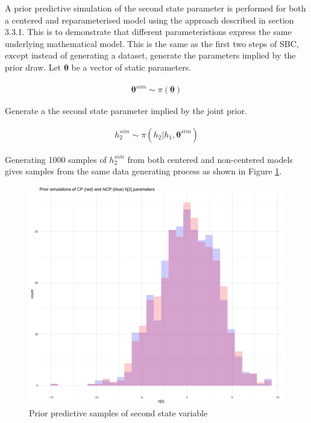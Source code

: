 \documentclass[12pt, a4paper]{article}
\begin{document}
        A prior predictive simulation of the second state parameter is performed for both a centered and reparameterised model using the approach described in section 3.3.1. This is to demonstrate that different parameteristions express the same underlying mathematical model. This is the same as the first two steps of SBC, except instead of generating a dataset, generate the parameters implied by the prior draw. Let $\boldsymbol{\theta}$ be a vector of static parameters.

        $$
        \begin{aligned}
        \boldsymbol{\theta}^{sim} \sim \pi(\boldsymbol{\theta})
        \end{aligned}
        $$

        Generate a the second state parameter implied by the joint prior.

        $$
        \begin{aligned}
        h_2^{sim} \sim \pi (h_2|h_1, \boldsymbol{\theta}^{sim})
        \end{aligned}
        $$

        Generating 1000 samples of $h_2^{sim}$ from both centered and non-centered models gives samples from the same data generating process as shown in Figure \ref{fig:priorpred}. 


        \begin{figure}[h]
            \centering
            \includegraphics[scale=0.1]{figures/ppc_h2.png}
            \caption{Prior predictive samples of second state variable}
            \label{fig:priorpred}
        \end{figure}
        
\end{document}
